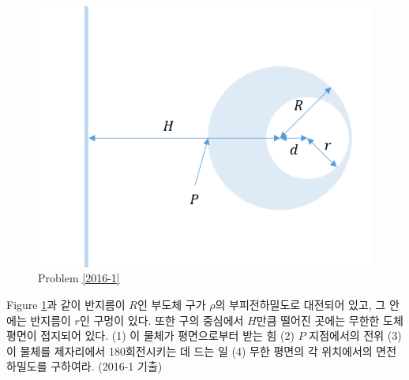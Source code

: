 \begin{problem}\label{2016-1}
\begin{figure}[h]
\centering\includegraphics[scale=0.6]{Pictures/2016-1.PNG}
\caption{Problem \ref{2016-1}}
\label{fig:2016-1} %
\end{figure}
Figure \ref{fig:2016-1}과 같이 반지름이 $R$인 부도체 구가 $\rho$의 부피전하밀도로 대전되어 있고, 그 안에는 반지름이 $r$인 구멍이 있다. 또한 구의 중심에서 $H$만큼 떨어진 곳에는 무한한 도체 평면이 접지되어 있다. (1) 이 물체가 평면으로부터 받는 힘 (2) $P$ 지점에서의 전위 (3) 이 물체를 제자리에서 180\degree 회전시키는 데 드는 일 (4) 무한 평면의 각 위치에서의 면전하밀도를 구하여라. (2016-1 기출) 
\end{problem}

